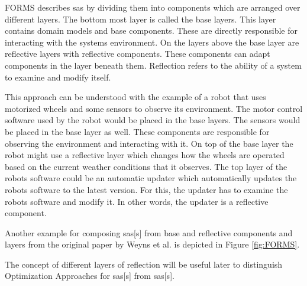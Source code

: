FORMS describes \acrshort{sas} by dividing them into components which are arranged over different layers.
The bottom most layer is called the base layers.
This layer contains domain models and base components.
These are directly responsible for interacting with the systems environment.
On the layers above the base layer are reflective layers with reflective components.
These components can adapt components in the layer beneath them.
Reflection refers to the ability of a system to examine and modify itself.

This approach can be understood with the example of a robot that uses motorized wheels
and some sensors to observe its environment.
The motor control software used by the robot would be placed in the base layers.
The sensors would be placed in the base layer as well.
These components are responsible for observing the environment and interacting with it.
On top of the base layer the robot might use a reflective layer which changes how the wheels are operated
based on the current weather conditions that it observes.
The top layer of the robots software could be an automatic updater 
which automatically updates the robots software to the latest version.
For this, the updater has to examine the robots software and modify it.
In other words, the updater is a reflective component.

Another example for composing \acrlong{sas}[s] from base and reflective components and layers
from the original paper by Weyns et al. is depicted in Figure \ref{fig:FORMS}.

\noindent The concept of different layers of reflection will be useful later to distinguish
Optimization Approaches for \acrlong{sas}[s] from \acrlong{sas}[s].

